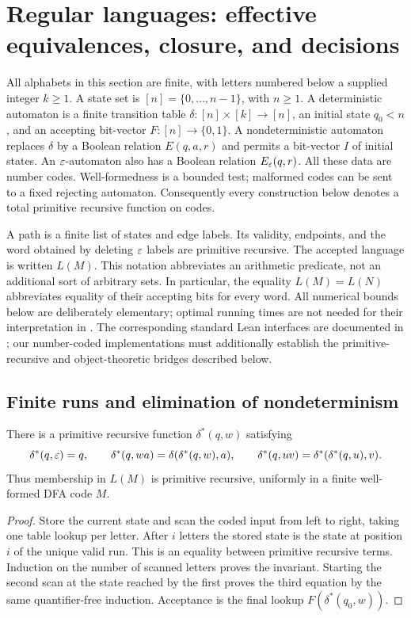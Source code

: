 \section{Regular languages: effective equivalences, closure, and decisions}
\label{sec:regular}

All alphabets in this section are finite, with letters numbered below a supplied
integer $k\geq 1$.  A state set is $[n]=\{0,\ldots,n-1\}$, with $n\geq1$.
A deterministic automaton is a finite transition table
$\delta:[n]\times[k]\to[n]$, an initial state $q_0<n$, and an accepting
bit-vector $F:[n]\to\{0,1\}$.  A nondeterministic automaton replaces
$\delta$ by a Boolean relation $E(q,a,r)$ and permits a bit-vector $I$ of
initial states.  An $\varepsilon$-automaton also has a Boolean relation $E_\varepsilon(q,r)$.
All these data are number codes.  Well-formedness is a bounded test; malformed
codes can be sent to a fixed rejecting automaton.  Consequently every
construction below denotes a total primitive recursive function on codes.

A path is a finite list of states and edge labels.  Its validity, endpoints,
and the word obtained by deleting $\varepsilon$ labels are primitive recursive.
The accepted language is written $L(M)$.  This notation abbreviates an
arithmetic predicate, not an additional sort of arbitrary sets.  In
particular, the equality $L(M)=L(N)$ abbreviates equality of their accepting
bits for every word.  All numerical bounds below are deliberately elementary;
optimal running times are not needed for their interpretation in \ipra.
The corresponding standard Lean interfaces are documented in
\cite{MathlibDFA,MathlibNFA,MathlibEpsilon}; our number-coded implementations
must additionally establish the primitive-recursive and object-theoretic
bridges described below.

\subsection{Finite runs and elimination of nondeterminism}

\begin{lemma}\label{reg:run}
There is a primitive recursive function $\delta^*(q,w)$ satisfying
\[
 \delta^*(q,\varepsilon)=q,\qquad
 \delta^*(q,wa)=\delta(\delta^*(q,w),a),\qquad
 \delta^*(q,uv)=\delta^*(\delta^*(q,u),v).
\]
Thus membership in $L(M)$ is primitive recursive, uniformly in a finite
well-formed DFA code $M$.
\end{lemma}
\begin{proof}
Store the current state and scan the coded input from left to right, taking
one table lookup per letter.  After $i$ letters the stored state is the state
at position $i$ of the unique valid run.  This is an equality between
primitive recursive terms.  Induction on the number of scanned letters
proves the invariant.  Starting the second scan at the state reached by the
first proves the third equation by the same quantifier-free induction.
Acceptance is the final lookup $F(\delta^*(q_0,w))$.
\end{proof}

